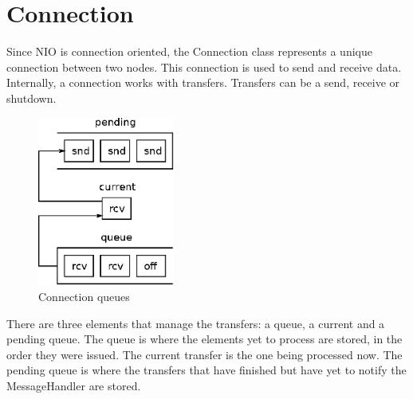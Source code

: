 \documentclass[11pt]{article}
\begin{document}
\section{Connection}
	Since NIO is connection oriented, the Connection class represents a unique connection between two nodes. This connection is used to send and receive data.\\
	Internally, a connection works with transfers. Transfers can be a send, receive or shutdown.
	\begin{figure}[H]
	\centering
	\includegraphics[width=45mm]{img/drawing9.eps}
	\caption[Connection queues]{Connection queues}
	\label{drawing9}
	\end{figure}
	There are three elements that manage the transfers: a queue, a current and a pending queue. The queue is where the elements yet to process are stored, in the order they were issued. The current transfer is the one being processed now. The pending queue is where the transfers that have finished but have yet to notify the MessageHandler are stored.
\end{document}
